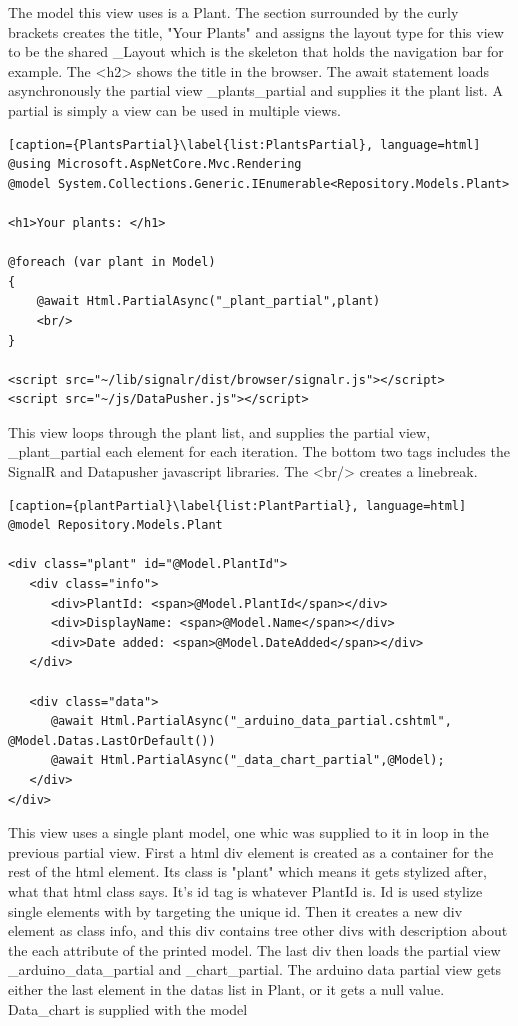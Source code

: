 \documentclass[a4paper,12pt,twoside,openright,titlepage]{book}
\begin{document}
The model this view uses is a Plant. The section surrounded by the curly brackets creates the title, "Your Plants" and assigns the layout type for this view to be the shared \_Layout which is the skeleton that holds the navigation bar for example. The <h2> shows the title in the browser. The await statement loads asynchronously the partial view \_plants\_partial and supplies it the plant list. A partial is simply a view can be used in multiple views.
\begin{center}
\begin{lstlisting}[caption={PlantsPartial}\label{list:PlantsPartial}, language=html]
@using Microsoft.AspNetCore.Mvc.Rendering
@model System.Collections.Generic.IEnumerable<Repository.Models.Plant>

<h1>Your plants: </h1>

@foreach (var plant in Model)
{
    @await Html.PartialAsync("_plant_partial",plant)
    <br/>
}

<script src="~/lib/signalr/dist/browser/signalr.js"></script>
<script src="~/js/DataPusher.js"></script>
\end{lstlisting}
\end{center}

This view loops through the plant list, and supplies the partial view, \_plant_partial each element for each iteration. The bottom two tags includes the SignalR and Datapusher javascript libraries. The <br/> creates a linebreak.


\begin{center}
\begin{lstlisting}[caption={plantPartial}\label{list:PlantPartial}, language=html]
@model Repository.Models.Plant

<div class="plant" id="@Model.PlantId">
   <div class="info">
      <div>PlantId: <span>@Model.PlantId</span></div>
      <div>DisplayName: <span>@Model.Name</span></div>
      <div>Date added: <span>@Model.DateAdded</span></div>
   </div>
   
   <div class="data">
      @await Html.PartialAsync("_arduino_data_partial.cshtml", @Model.Datas.LastOrDefault())
      @await Html.PartialAsync("_data_chart_partial",@Model);
   </div>
</div>
\end{lstlisting}
\end{center}

This view uses a single plant model, one whic was supplied to it in loop in the previous partial view. First a html div element is created as a container for the rest of the html element. Its class is "plant" which means it gets stylized after, what that html class says. It's id tag is whatever PlantId is. Id is used stylize single elements with by targeting the unique id. Then it creates a new div element as class info, and this div contains tree other divs with description about the each attribute of the printed model. The last div then loads the partial view \_arduino\_data\_partial and \data_chart_partial. The arduino data partial view gets either the last element in the datas list in Plant, or it gets a null value. Data\_chart is supplied with the model
\appendix
\end{document}
